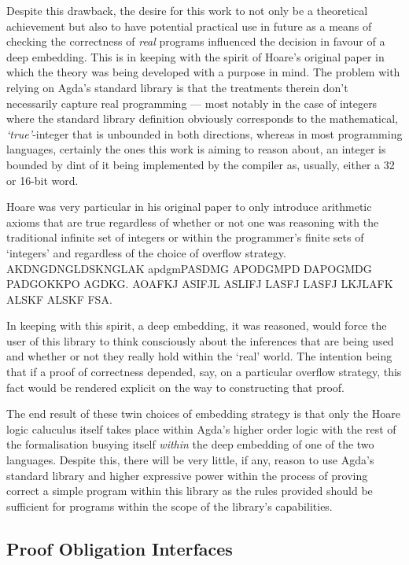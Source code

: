 \documentclass[oneside,12pt]{article}
\begin{document}
\pagebreak

Despite this drawback, the desire for this work to not only be a theoretical achievement but also to have potential practical use in future as a means of checking the correctness of \emph{real} programs influenced the decision in favour of a deep embedding. This is in keeping with the spirit of Hoare's original paper in which the theory was being developed with a purpose in mind. The problem with relying on Agda's standard library is that the treatments therein don't necessarily capture real programming --- most notably in the case of integers where the standard library definition obviously corresponds to the mathematical, \emph{`true'}-integer that is unbounded in both directions, whereas in most programming languages, certainly the ones this work is aiming to reason about, an integer is bounded by dint of it being implemented by the compiler as, usually, either a 32 or 16-bit word.

Hoare was very particular in his original paper to only introduce arithmetic axioms that are true regardless of whether or not one was reasoning with the traditional infinite set of integers or within the programmer's finite sets of `integers' and regardless of the choice of overflow strategy. AKDNGDNGLDSKNGLAK apdgmPASDMG  APODGMPD DAPOGMDG PADGOKKPO AGDKG. AOAFKJ ASIFJL ASLIFJ LASFJ LASFJ LKJLAFK ALSKF ALSKF FSA.

In keeping with this spirit, a deep embedding, it was reasoned, would force the user of this library to think consciously about the inferences that are being used and whether or not they really hold within the `real' world. The intention being that if a proof of correctness depended, say, on a particular overflow strategy, this fact would be rendered explicit on the way to constructing that proof.

The end result of these twin choices of embedding strategy is that only the Hoare logic caluculus itself takes place within Agda's higher order logic with the rest of the formalisation busying itself \emph{within} the deep embedding of one of the two languages. Despite this, there will be very little, if any, reason to use Agda's standard library and higher expressive power within the process of proving correct a simple program within this library as the rules provided should be sufficient for programs within the scope of the library's capabilities.


\pagebreak


\subsection{Proof Obligation Interfaces}
\end{document}
